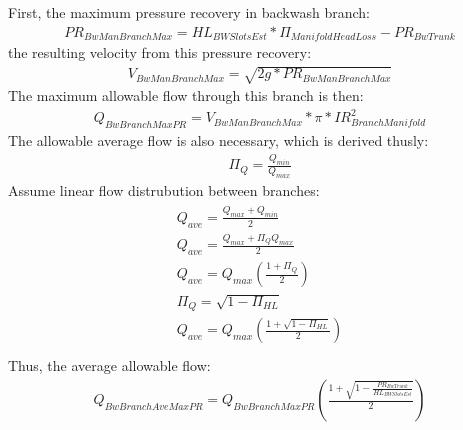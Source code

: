 \documentclass[letterpaper,10pt,english]{sphinxmanual}
\begin{document}
First, the maximum pressure recovery in backwash branch:
\begin{equation}\label{equation:Filtration/Filtration_Derivations:Filtration/Filtration_Derivations:18}
\begin{split}PR_{BwManBranchMax} = HL_{BWSlotsEst}*\Pi_{ManifoldHeadLoss} - PR_{BwTrunk}\end{split}
\end{equation}
the resulting velocity from this pressure recovery:
\begin{equation}\label{equation:Filtration/Filtration_Derivations:Filtration/Filtration_Derivations:19}
\begin{split}V_{BwManBranchMax} = \sqrt{2g*PR_{BwManBranchMax}}\end{split}
\end{equation}
The maximum allowable flow through this branch is then:
\begin{equation}\label{equation:Filtration/Filtration_Derivations:Filtration/Filtration_Derivations:20}
\begin{split}Q_{BwBranchMaxPR} = V_{BwManBranchMax}*\pi*IR_{BranchManifold}^2\end{split}
\end{equation}
The allowable average flow is also necessary, which is derived thusly:
\begin{equation}\label{equation:Filtration/Filtration_Derivations:Filtration/Filtration_Derivations:21}
\begin{split}\Pi_{Q} = \frac{Q_{min}}{Q_{max}}\end{split}
\end{equation}
Assume linear flow distrubution between branches:
\begin{align}\label{equation:Filtration/Filtration_Derivations:Filtration/Filtration_Derivations:22}\!\begin{aligned}
Q_{ave} = \frac{Q_{max} + Q_{min}}{2}\\
Q_{ave} = \frac{Q_{max} + \Pi_{Q}Q_{max}}{2}\\
Q_{ave} = Q_{max}(\frac{1 + \Pi_{Q}} {2} )\\
\Pi_{Q} = \sqrt{1 - \Pi_{HL}}\\
Q_{ave} = Q_{max}(\frac{1 + \sqrt{1 - \Pi_{HL}}} {2} )\\
\end{aligned}\end{align}
Thus, the average allowable flow:
\begin{equation}\label{equation:Filtration/Filtration_Derivations:Filtration/Filtration_Derivations:23}
\begin{split}Q_{BwBranchAveMaxPR} = Q_{BwBranchMaxPR}(\frac{1 + \sqrt{1-\frac{PR_{BwTrunk}}{HL_{BWSlotsEst}}}} {2} )\end{split}
\end{equation}
\end{document}
